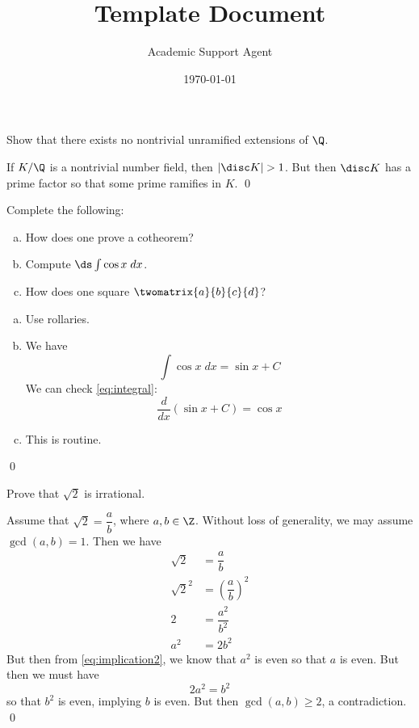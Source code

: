 \documentclass{article}
\title{Template Document}
\author{Academic Support Agent}
\date{\today}
\begin{document}
\maketitle

\thispagestyle{title}



\problem Show that there exists no nontrivial unramified extensions of $\Q$. \pspace

\solution  If $K/\Q$ is a nontrivial number field, then $|\disc K|>1$. But then $\disc K$ has a prime factor so that some prime ramifies in $K$. \qed \pspace



\problem Complete the following:
        \begin{enumerate}[(a)]
	\item How does one prove a cotheorem?
	\item Compute $\ds \int \cos x \;dx$.
	\item How does one square $\twomatrix{a}{b}{c}{d}$?       
        \end{enumerate}

\solution
\begin{enumerate}[(a)]
\item Use rollaries.

\item We have
	\begin{equation} \label{eq:integral}
	\int \cos x \;dx= \sin x + C	
	\end{equation}
We can check \eqref{eq:integral}:
	\[
	\dfrac{d}{dx} \left( \sin x + C \right)= \cos x
	\]

\item This is routine. 
\end{enumerate} \qed \pspace



\problem Prove that $\sqrt{2}$ is irrational. \pspace

\pf Assume that $\sqrt{2}= \dfrac{a}{b}$, where $a,b \in \Z$. Without loss of generality, we may assume $\gcd(a,b)= 1$. Then we have
	\begin{align}
	\sqrt{2}&= \dfrac{a}{b} \nonumber \\
	\sqrt{2}^2&= \left( \dfrac{a}{b} \right)^2 \label{eq:implication1} \\
	2&= \dfrac{a^2}{b^2} \nonumber \\
	a^2&= 2b^2 \label{eq:implication2}
	\end{align}
But then from \eqref{eq:implication2}, we know that $a^2$ is even so that $a$ is even. But then we must have
	\[
	2a^2= b^2
	\]
so that $b^2$ is even, implying $b$ is even. But then $\gcd(a,b) \geq 2$, a contradiction. \qed \\
\end{document}
